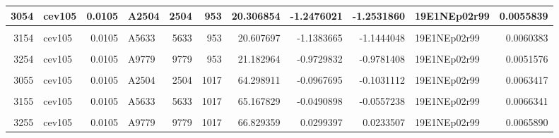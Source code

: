 \documentclass[
]{article}
\begin{document}
\begin{table}[!h]
{\begin{tabular}{r|l|r|l|r|r|r|r|r|l|r}
\hline
3054 & cev105 & 0.0105 & A2504 & 2504 & 953 & 20.306854 & -1.2476021 & -1.2531860 & 19E1NEp02r99 & 0.0055839\\
\hline
\cellcolor{gray!6}{3104} & \cellcolor{gray!6}{cev105} & \cellcolor{gray!6}{0.0105} & \cellcolor{gray!6}{A4145} & \cellcolor{gray!6}{4145} & \cellcolor{gray!6}{953} & \cellcolor{gray!6}{20.452876} & \cellcolor{gray!6}{-1.1916003} & \cellcolor{gray!6}{-1.1975215} & \cellcolor{gray!6}{19E1NEp02r99} & \cellcolor{gray!6}{0.0059211}\\
\hline
3154 & cev105 & 0.0105 & A5633 & 5633 & 953 & 20.607697 & -1.1383665 & -1.1444048 & 19E1NEp02r99 & 0.0060383\\
\hline
\cellcolor{gray!6}{3204} & \cellcolor{gray!6}{cev105} & \cellcolor{gray!6}{0.0105} & \cellcolor{gray!6}{A7274} & \cellcolor{gray!6}{7274} & \cellcolor{gray!6}{953} & \cellcolor{gray!6}{20.807359} & \cellcolor{gray!6}{-1.0766095} & \cellcolor{gray!6}{-1.0823344} & \cellcolor{gray!6}{19E1NEp02r99} & \cellcolor{gray!6}{0.0057250}\\
\hline
3254 & cev105 & 0.0105 & A9779 & 9779 & 953 & 21.182964 & -0.9729832 & -0.9781408 & 19E1NEp02r99 & 0.0051576\\
\hline
\cellcolor{gray!6}{3005} & \cellcolor{gray!6}{cev105} & \cellcolor{gray!6}{0.0105} & \cellcolor{gray!6}{A0} & \cellcolor{gray!6}{0} & \cellcolor{gray!6}{1017} & \cellcolor{gray!6}{63.774766} & \cellcolor{gray!6}{-0.1284542} & \cellcolor{gray!6}{-0.1342653} & \cellcolor{gray!6}{19E1NEp02r99} & \cellcolor{gray!6}{0.0058110}\\
\hline
3055 & cev105 & 0.0105 & A2504 & 2504 & 1017 & 64.298911 & -0.0967695 & -0.1031112 & 19E1NEp02r99 & 0.0063417\\
\hline
\cellcolor{gray!6}{3105} & \cellcolor{gray!6}{cev105} & \cellcolor{gray!6}{0.0105} & \cellcolor{gray!6}{A4145} & \cellcolor{gray!6}{4145} & \cellcolor{gray!6}{1017} & \cellcolor{gray!6}{64.720664} & \cellcolor{gray!6}{-0.0728485} & \cellcolor{gray!6}{-0.0793940} & \cellcolor{gray!6}{19E1NEp02r99} & \cellcolor{gray!6}{0.0065454}\\
\hline
3155 & cev105 & 0.0105 & A5633 & 5633 & 1017 & 65.167829 & -0.0490898 & -0.0557238 & 19E1NEp02r99 & 0.0066341\\
\hline
\cellcolor{gray!6}{3205} & \cellcolor{gray!6}{cev105} & \cellcolor{gray!6}{0.0105} & \cellcolor{gray!6}{A7274} & \cellcolor{gray!6}{7274} & \cellcolor{gray!6}{1017} & \cellcolor{gray!6}{65.744507} & \cellcolor{gray!6}{-0.0203378} & \cellcolor{gray!6}{-0.0269149} & \cellcolor{gray!6}{19E1NEp02r99} & \cellcolor{gray!6}{0.0065772}\\
\hline
3255 & cev105 & 0.0105 & A9779 & 9779 & 1017 & 66.829359 & 0.0299397 & 0.0233507 & 19E1NEp02r99 & 0.0065890\\
\hline
\end{tabular}}
\end{table}
\end{document}
